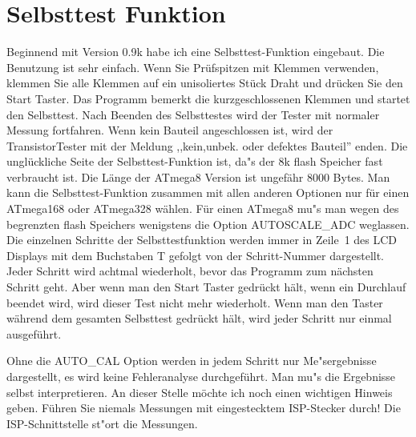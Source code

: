 
\section{Selbsttest Funktion}
\label{sec:selftest}
Beginnend mit Version 0.9k habe ich eine Selbsttest-Funktion eingebaut.
Die Benutzung ist sehr einfach.
Wenn Sie Pr\"ufspitzen mit Klemmen verwenden, klemmen Sie alle Klemmen auf ein unisoliertes St\"uck Draht und dr\"ucken Sie
den Start Taster.
Das Programm bemerkt die kurzgeschlossenen Klemmen und startet den Selbsttest.
Nach Beenden des Selbsttestes wird der Tester mit normaler Messung fortfahren.
Wenn kein Bauteil angeschlossen ist, wird der TransistorTester mit der
Meldung ,,kein,unbek. oder defektes Bauteil'' enden.
Die ungl\"uckliche Seite der Selbsttest-Funktion ist, da"s der 8k flash Speicher fast verbraucht ist.
Die L\"ange der ATmega8 Version ist ungef\"ahr 8000 Bytes.
Man kann die Selbsttest-Funktion zusammen mit allen anderen Optionen nur f\"ur einen ATmega168
oder ATmega328 w\"ahlen.
F\"ur einen ATmega8 mu"s man wegen des begrenzten flash Speichers wenigstens die Option AUTOSCALE\_ADC weglassen.
Die einzelnen Schritte der Selbsttestfunktion werden immer in Zeile~1 des LCD Displays mit dem Buchstaben T
gefolgt von der Schritt-Nummer dargestellt.
Jeder Schritt wird achtmal wiederholt, bevor das Programm zum n\"achsten Schritt geht.
Aber wenn man den Start Taster gedr\"uckt h\"alt, wenn ein Durchlauf beendet wird, wird dieser Test nicht
mehr wiederholt.
Wenn man den Taster w\"ahrend dem gesamten Selbsttest gedr\"uckt h\"alt, wird jeder Schritt nur einmal ausgef\"uhrt.

Ohne die AUTO\_CAL Option werden in jedem Schritt nur Me"sergebnisse dargestellt, es wird keine Fehleranalyse durchgef\"uhrt.
Man  mu"s die Ergebnisse selbst interpretieren.
An dieser Stelle m\"ochte ich noch einen wichtigen Hinweis geben. F\"uhren Sie niemals Messungen mit
eingestecktem ISP-Stecker durch!
Die ISP-Schnittstelle st"ort die Messungen.

